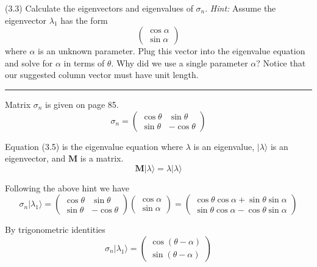 \documentclass[12pt]{article}
\begin{document}
(3.3)
Calculate the eigenvectors and eigenvalues of $\sigma_n$.
{\it Hint:}
Assume the eigenvector $\lambda_1$ has the form
\begin{equation*}
\begin{pmatrix}\cos\alpha\\\sin\alpha\end{pmatrix}
\end{equation*}
where $\alpha$ is an unknown parameter.
Plug this vector into the eigenvalue equation and
solve for $\alpha$ in terms of $\theta$.
Why did we use a single parameter $\alpha$?
Notice that our suggested column vector must have unit length.

\bigskip
\hrule

\bigskip
Matrix $\sigma_n$ is given on page 85.
\begin{equation*}
\sigma_n=\begin{pmatrix}
\cos\theta & \sin\theta
\\
\sin\theta & -\cos\theta
\end{pmatrix}
\end{equation*}

Equation (3.5) is the eigenvalue equation where $\lambda$ is an eigenvalue,
$|\lambda\rangle$ is an eigenvector, and $\mathbf M$ is a matrix.
\begin{equation*}
\mathbf M|\lambda\rangle=\lambda|\lambda\rangle
\tag{3.5}
\end{equation*}

Following the above hint we have
\begin{equation*}
\sigma_n|\lambda_1\rangle=\begin{pmatrix}
\cos\theta & \sin\theta
\\
\sin\theta & -\cos\theta
\end{pmatrix}
\begin{pmatrix}\cos\alpha\\\sin\alpha\end{pmatrix}
=\begin{pmatrix}
\cos\theta\cos\alpha+\sin\theta\sin\alpha
\\
\sin\theta\cos\alpha-\cos\theta\sin\alpha
\end{pmatrix}
\end{equation*}

By trigonometric identities
\begin{equation*}
\sigma_n|\lambda_1\rangle
=\begin{pmatrix}
\cos(\theta-\alpha)
\\
\sin(\theta-\alpha)
\end{pmatrix}
\end{equation*}
\end{document}
